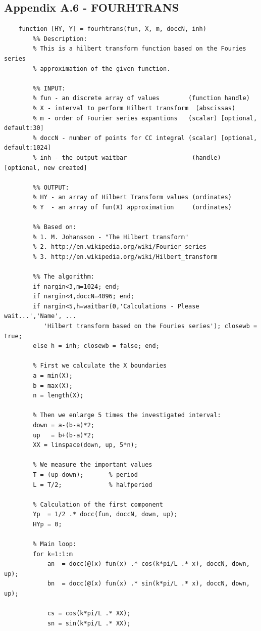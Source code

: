 \documentclass[12pt,twoside,a4paper]{article}
\numberwithin{equation}{subsection}
\numberwithin{figure}{subsection}
\begin{document}
\subsection*{Appendix A.6 - FOURHTRANS}
\begin{lstlisting}
	function [HY, Y] = fourhtrans(fun, X, m, doccN, inh)
	    %% Description: 
	    % This is a hilbert transform function based on the Fouries series
	    % approximation of the given function.
	    
	    %% INPUT:
	    % fun - an discrete array of values        (function handle)
	    % X - interval to perform Hilbert transform  (abscissas)
	    % m - order of Fourier series expantions   (scalar) [optional, default:30]
	    % doccN - number of points for CC integral (scalar) [optional, default:1024]
	    % inh - the output waitbar                  (handle) [optional, new created]
	    
	    %% OUTPUT:
	    % HY - an array of Hilbert Transform values (ordinates)
	    % Y  - an array of fun(X) approximation     (ordinates)
	    
	    %% Based on:
	    % 1. M. Johansson - "The Hilbert transform"
	    % 2. http://en.wikipedia.org/wiki/Fourier_series
	    % 3. http://en.wikipedia.org/wiki/Hilbert_transform
	    
	    %% The algorithm:
	    if nargin<3,m=1024; end;
	    if nargin<4,doccN=4096; end;
	    if nargin<5,h=waitbar(0,'Calculations - Please wait...','Name', ...
	       'Hilbert transform based on the Fouries series'); closewb = true; 
	    else h = inh; closewb = false; end;
	
	    % First we calculate the X boundaries
	    a = min(X);       
	    b = max(X);
	    n = length(X);
	
	    % Then we enlarge 5 times the investigated interval:
	    down = a-(b-a)*2; 
	    up   = b+(b-a)*2;
	    XX = linspace(down, up, 5*n);
	
	    % We measure the important values
	    T = (up-down);       % period
	    L = T/2;             % halfperiod
	
	    % Calculation of the first component
	    Yp  = 1/2 .* docc(fun, doccN, down, up);
	    HYp = 0;
	
	    % Main loop:
	    for k=1:1:m
	        an  = docc(@(x) fun(x) .* cos(k*pi/L .* x), doccN, down, up);
	        bn  = docc(@(x) fun(x) .* sin(k*pi/L .* x), doccN, down, up);
	
	        cs = cos(k*pi/L .* XX);
	        sn = sin(k*pi/L .* XX);
	        

\end{lstlisting}
\end{document}
